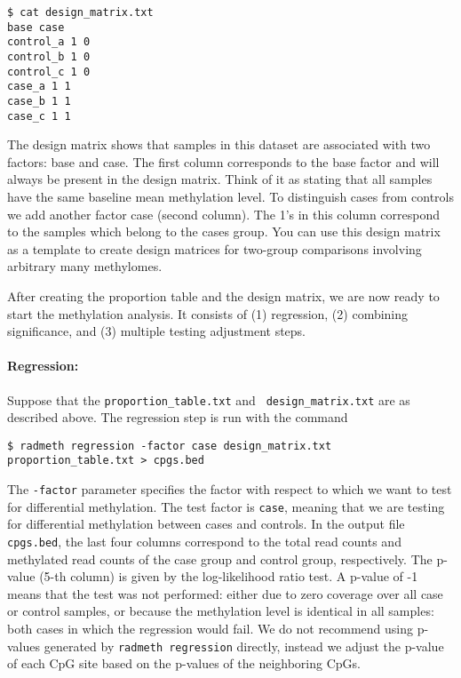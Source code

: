 \documentclass[10pt]{article}
\begin{document}
{\small{%
\begin{verbatim}
$ cat design_matrix.txt
base case
control_a 1 0
control_b 1 0
control_c 1 0
case_a 1 1
case_b 1 1
case_c 1 1
\end{verbatim}%
}}

The design matrix shows that samples in this dataset are associated with two
factors: base and case. The first column corresponds to the base factor and
will always be present in the design matrix. Think of it as stating that all
samples have the same baseline mean methylation level. To distinguish
cases from controls we add another factor case (second column). The 1's in
this column correspond to the samples which belong to the cases group. You
can use this design matrix as a template to create design matrices for
two-group comparisons involving arbitrary many methylomes.

After creating the proportion table and the design matrix, we are now ready
to start the methylation analysis. It consists of (1) regression, (2)
combining significance, and (3) multiple testing adjustment steps.

\paragraph{Regression:} Suppose that the {\tt proportion\_table.txt} and {\tt
design\_matrix.txt} are as described above. The regression step is run with
the command

{\small{%
\begin{verbatim}
$ radmeth regression -factor case design_matrix.txt proportion_table.txt > cpgs.bed
\end{verbatim}%
}}

The {\tt -factor} parameter specifies the factor with respect to which we
want to test for differential methylation. The test factor is {\tt case},
meaning that we are testing for differential methylation between cases and
controls.
In the output file {\tt cpgs.bed},
the last four columns correspond to the total read counts and
methylated read counts of the case group and control group, respectively.
The p-value (5-th column) is given by the log-likelihood ratio test. A
p-value of -1 means that the test was not performed: either due to zero
coverage over all case or control samples, or because the methylation level
is identical in all samples: both cases in which the regression would fail.
We do not recommend using p-values generated by {\tt radmeth regression} directly,
instead we adjust the p-value of each CpG site based on the p-values of the
neighboring CpGs.
\end{document}
